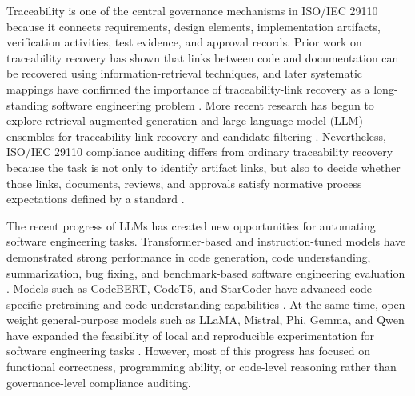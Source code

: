 \documentclass{ieeeaccess}
\begin{document}
Traceability is one of the central governance mechanisms in ISO/IEC 29110 because it connects requirements, design elements, implementation artifacts, verification activities, test evidence, and approval records. Prior work on traceability recovery has shown that links between code and documentation can be recovered using information-retrieval techniques, and later systematic mappings have confirmed the importance of traceability-link recovery as a long-standing software engineering problem \cite{antoniol2002traceability,borg2013traceability}. More recent research has begun to explore retrieval-augmented generation and large language model (LLM) ensembles for traceability-link recovery and candidate filtering \cite{fuchss2025lissa,fuchss2025llmtrace}. Nevertheless, ISO/IEC 29110 compliance auditing differs from ordinary traceability recovery because the task is not only to identify artifact links, but also to decide whether those links, documents, reviews, and approvals satisfy normative process expectations defined by a standard \cite{iso29110_2024,castellanos2022processcompliance}.

The recent progress of LLMs has created new opportunities for automating software engineering tasks. Transformer-based and instruction-tuned models have demonstrated strong performance in code generation, code understanding, summarization, bug fixing, and benchmark-based software engineering evaluation \cite{jiang2024surveycodegen,lu2021codexglue,jimenez2023swebench,jain2024livecodebench}. Models such as CodeBERT, CodeT5, and StarCoder have advanced code-specific pretraining and code understanding capabilities \cite{feng2020codebert,wang2021codet5,li2023starcoder}. At the same time, open-weight general-purpose models such as LLaMA, Mistral, Phi, Gemma, and Qwen have expanded the feasibility of local and reproducible experimentation for software engineering tasks \cite{touvron2023llama,jiang2023mistral,abdin2024phi3,riviere2024gemma2,yang2024qwen25}. However, most of this progress has focused on functional correctness, programming ability, or code-level reasoning rather than governance-level compliance auditing.
\end{document}
